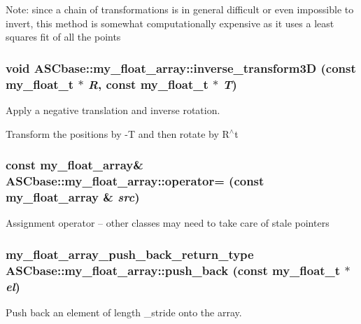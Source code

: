 Note: since a chain of transformations is in general difficult or even impossible to invert, this method is somewhat computationally expensive as it uses a least squares fit of all the points 
\subsubsection{\setlength{\rightskip}{0pt plus 5cm}void ASCbase::my\_\-float\_\-array::inverse\_\-transform3D (const my\_\-float\_\-t $\ast$ {\em R}, const my\_\-float\_\-t $\ast$ {\em T})\hspace{0.3cm}{\tt  [inline]}}\label{classASCbase_1_1my__float__array_36cecd78c077ff31ded38a0194b862f2}


Apply a negative translation and inverse rotation. 

Transform the positions by -T and then rotate by R$^\wedge$t 
\subsubsection{\setlength{\rightskip}{0pt plus 5cm}const \bf{my\_\-float\_\-array}\& ASCbase::my\_\-float\_\-array::operator= (const \bf{my\_\-float\_\-array} \& {\em src})\hspace{0.3cm}{\tt  [inline]}}\label{classASCbase_1_1my__float__array_cf2256fd42e02535450e38db5350b987}


Assignment operator -- other classes may need to take care of stale pointers 
\subsubsection{\setlength{\rightskip}{0pt plus 5cm}my\_\-float\_\-array\_\-push\_\-back\_\-return\_\-type ASCbase::my\_\-float\_\-array::push\_\-back (const my\_\-float\_\-t $\ast$ {\em el})\hspace{0.3cm}{\tt  [inline]}}\label{classASCbase_1_1my__float__array_d1cf330a07c7789f5ef224cc93374277}


Push back an element of length \_\-stride onto the array. 

